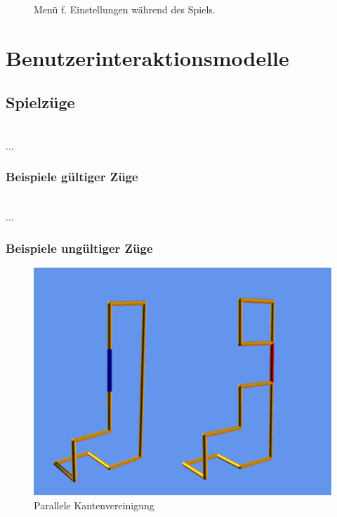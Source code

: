 	\begin{figure}[!ht]
		  \centering
		  
		  \caption{Menü f. Einstellungen während des Spiels.}
	\end{figure}

	
\clearpage


\section{Benutzerinteraktionsmodelle}

	\begin{figure}[ht]
		  \centering
		  
	\end{figure}
	
\clearpage

\subsection{Spielzüge}

~\\
...

\subsubsection{Beispiele gültiger Züge}

~\\
...

\subsubsection{Beispiele ungültiger Züge}

	\begin{figure}[htb]
	  \centering
	  \includegraphics[width = \textwidth]{Systemmodelle/Ungueltiger_Zug.png}
	  \caption{Parallele Kantenvereinigung}
	  \label{fig:zug1}
	\end{figure}

